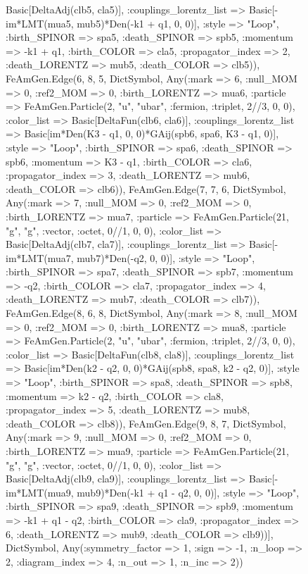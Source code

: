 \documentclass{revtex4}
\begin{document}
\begin{figure}[!htb]
\begin{center}
{Basic[DeltaAdj(clb5, cla5)], :couplings_lorentz_list => Basic[-im*LMT(mua5, mub5)*Den(-k1 + q1, 0, 0)], :style => "Loop", :birth_SPINOR => spa5, :death_SPINOR => spb5, :momentum => -k1 + q1, :birth_COLOR => cla5, :propagator_index => 2, :death_LORENTZ => mub5, :death_COLOR => clb5)), FeAmGen.Edge(6, 8, 5, Dict{Symbol, Any}(:mark => 6, :null_MOM => 0, :ref2_MOM => 0, :birth_LORENTZ => mua6, :particle => FeAmGen.Particle(2, "u", "ubar", :fermion, :triplet, 2//3, 0, 0), :color_list => Basic[DeltaFun(clb6, cla6)], :couplings_lorentz_list => Basic[im*Den(K3 - q1, 0, 0)*GAij(spb6, spa6, K3 - q1, 0)], :style => "Loop", :birth_SPINOR => spa6, :death_SPINOR => spb6, :momentum => K3 - q1, :birth_COLOR => cla6, :propagator_index => 3, :death_LORENTZ => mub6, :death_COLOR => clb6)), FeAmGen.Edge(7, 7, 6, Dict{Symbol, Any}(:mark => 7, :null_MOM => 0, :ref2_MOM => 0, :birth_LORENTZ => mua7, :particle => FeAmGen.Particle(21, "g", "g", :vector, :octet, 0//1, 0, 0), :color_list => Basic[DeltaAdj(clb7, cla7)], :couplings_lorentz_list => Basic[-im*LMT(mua7, mub7)*Den(-q2, 0, 0)], :style => "Loop", :birth_SPINOR => spa7, :death_SPINOR => spb7, :momentum => -q2, :birth_COLOR => cla7, :propagator_index => 4, :death_LORENTZ => mub7, :death_COLOR => clb7)), FeAmGen.Edge(8, 6, 8, Dict{Symbol, Any}(:mark => 8, :null_MOM => 0, :ref2_MOM => 0, :birth_LORENTZ => mua8, :particle => FeAmGen.Particle(2, "u", "ubar", :fermion, :triplet, 2//3, 0, 0), :color_list => Basic[DeltaFun(clb8, cla8)], :couplings_lorentz_list => Basic[im*Den(k2 - q2, 0, 0)*GAij(spb8, spa8, k2 - q2, 0)], :style => "Loop", :birth_SPINOR => spa8, :death_SPINOR => spb8, :momentum => k2 - q2, :birth_COLOR => cla8, :propagator_index => 5, :death_LORENTZ => mub8, :death_COLOR => clb8)), FeAmGen.Edge(9, 8, 7, Dict{Symbol, Any}(:mark => 9, :null_MOM => 0, :ref2_MOM => 0, :birth_LORENTZ => mua9, :particle => FeAmGen.Particle(21, "g", "g", :vector, :octet, 0//1, 0, 0), :color_list => Basic[DeltaAdj(clb9, cla9)], :couplings_lorentz_list => Basic[-im*LMT(mua9, mub9)*Den(-k1 + q1 - q2, 0, 0)], :style => "Loop", :birth_SPINOR => spa9, :death_SPINOR => spb9, :momentum => -k1 + q1 - q2, :birth_COLOR => cla9, :propagator_index => 6, :death_LORENTZ => mub9, :death_COLOR => clb9))], Dict{Symbol, Any}(:symmetry_factor => 1, :sign => -1, :n_loop => 2, :diagram_index => 4, :n_out => 1, :n_inc => 2)) 
}
\end{center}
\end{figure}
\end{document}
